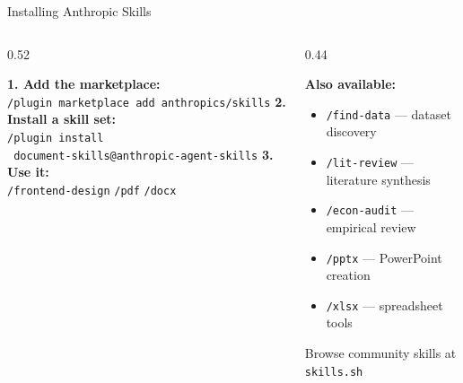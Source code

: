 \documentclass[aspectratio=169, 10pt]{beamer}
\begin{document}
\begin{frame}{Installing Anthropic Skills}
\begin{columns}[T]
\begin{column}{0.52\textwidth}
\begin{tcolorbox}[keybox, title={\faDownload\quad Step-by-Step}]
\scriptsize
\textbf{1. Add the marketplace:}\\
\texttt{/plugin marketplace add anthropics/skills}
\vskip4pt
\textbf{2. Install a skill set:}\\
\texttt{/plugin install}\\
\texttt{\; document-skills@anthropic-agent-skills}
\vskip4pt
\textbf{3. Use it:}\\
\texttt{/frontend-design} \; \texttt{/pdf} \; \texttt{/docx}
\end{tcolorbox}
\end{column}
\begin{column}{0.44\textwidth}
\vskip2pt
\begin{tcolorbox}[accentbox]
\scriptsize
\textbf{Also available:}
\begin{itemize}\setlength{\itemsep}{0pt}\tiny
  \item \texttt{/find-data} --- dataset discovery
  \item \texttt{/lit-review} --- literature synthesis
  \item \texttt{/econ-audit} --- empirical review
  \item \texttt{/pptx} --- PowerPoint creation
  \item \texttt{/xlsx} --- spreadsheet tools
\end{itemize}
\end{tcolorbox}
\vskip3pt
{\tiny\color{CoolGray} Browse community skills at \texttt{skills.sh}}
\end{column}
\end{columns}
\end{frame}
\end{document}

